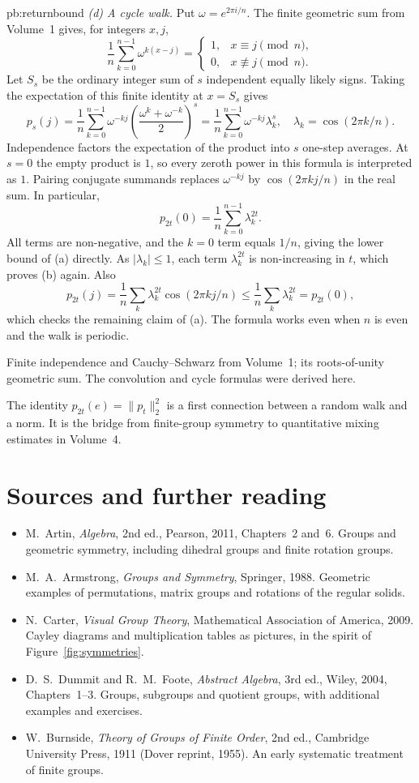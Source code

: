 \begin{solution}{pb:returnbound}
\emph{(d) A cycle walk.}
Put $\omega=e^{2\pi i/n}$. The finite geometric sum from Volume~1 gives, for integers $x,j$,
\[
\frac1n\sum_{k=0}^{n-1}\omega^{k(x-j)}=
\begin{cases}1,&x\equiv j\pmod n,\\0,&x\not\equiv j\pmod n.\end{cases}
\]
Let $S_s$ be the ordinary integer sum of $s$ independent equally likely signs. Taking the expectation of this finite identity at $x=S_s$ gives
\[
p_s(j)=\frac1n\sum_{k=0}^{n-1}\omega^{-kj}
\left(\frac{\omega^k+\omega^{-k}}2\right)^s
=\frac1n\sum_{k=0}^{n-1}\omega^{-kj}\lambda_k^s,
\quad \lambda_k=\cos(2\pi k/n).
\]
Independence factors the expectation of the product into $s$ one-step averages. At $s=0$ the empty product is $1$, so every zeroth power in this formula is interpreted as $1$. Pairing conjugate summands replaces $\omega^{-kj}$ by $\cos(2\pi kj/n)$ in the real sum. In particular,
\[
p_{2t}(0)=\frac1n\sum_{k=0}^{n-1}\lambda_k^{2t}.
\]
All terms are non-negative, and the $k=0$ term equals $1/n$, giving the lower bound of (a) directly. As $|\lambda_k|\le1$, each term $\lambda_k^{2t}$ is non-increasing in $t$, which proves (b) again. Also
\[
p_{2t}(j)=\frac1n\sum_k\lambda_k^{2t}\cos(2\pi kj/n)
\le\frac1n\sum_k\lambda_k^{2t}=p_{2t}(0),
\]
which checks the remaining claim of (a). The formula works even when $n$ is even and the walk is periodic.

\tools Finite independence and Cauchy--Schwarz from Volume~1; its roots-of-unity geometric sum. The convolution and cycle formulas were derived here.

\leads The identity $p_{2t}(e)=\|p_t\|_2^2$ is a first connection between a random walk and a norm. It is the bridge from finite-group symmetry to quantitative mixing estimates in Volume~4.
\end{solution}

\section*{Sources and further reading}

\begin{itemize}
\item M.~Artin, \emph{Algebra}, 2nd ed., Pearson, 2011, Chapters~2 and~6. Groups and geometric symmetry, including dihedral groups and finite rotation groups.
\item M.~A.~Armstrong, \emph{Groups and Symmetry}, Springer, 1988. Geometric examples of permutations, matrix groups and rotations of the regular solids.
\item N.~Carter, \emph{Visual Group Theory}, Mathematical Association of America, 2009. Cayley diagrams and multiplication tables as pictures, in the spirit of Figure~\ref{fig:symmetries}.
\item D.~S.~Dummit and R.~M.~Foote, \emph{Abstract Algebra}, 3rd ed., Wiley, 2004, Chapters~1--3. Groups, subgroups and quotient groups, with additional examples and exercises.
\item W.~Burnside, \emph{Theory of Groups of Finite Order}, 2nd ed., Cambridge University Press, 1911 (Dover reprint, 1955). An early systematic treatment of finite groups.
\end{itemize}
